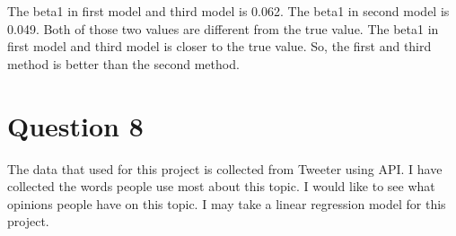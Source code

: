 \documentclass{article}
\begin{document}
The beta1 in first model and third model is 0.062. The beta1 in second model is 0.049. Both of those two values are different from the true value. The beta1 in first model and third model is closer to the true value. So, the first and third method is better than the second method. 

\section{Question 8}

The data that used for this project is collected from Tweeter using API. I have collected the words people use most about this topic. I would like to see what opinions people have on this topic. I may take a linear regression model for this project. 
\end{document}

